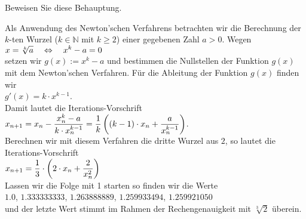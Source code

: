 \exercise
Beweisen Sie diese Behauptung. \eox


\example
Als Anwendung des
Newton'schen Verfahrens betrachten wir die Berechnung der $k$-ten Wurzel ($k\in\mathbb{N}$ mit
$k\geq 2$) einer gegebenen Zahl $a>0$. Wegen 
\\[0.2cm]
\hspace*{1.3cm}
$\displaystyle x = \sqrt[k]{a} \quad\Leftrightarrow\quad x^k - a = 0$
\\[0.2cm]
setzen wir $g(x) := x^k - a$ und bestimmen die Nullstellen der Funktion $g(x)$ mit dem
Newton'schen Verfahren.  F\"ur die Ableitung der Funktion $g(x)$ finden wir 
\\[0.2cm]
\hspace*{1.3cm}
$g'(x) = k\cdot x^{k-1}$.
\\[0.2cm]
Damit lautet die Iterations-Vorschrift
\\[0.3cm]
\hspace*{1.3cm}
$\displaystyle x_{n+1} = x_n - \frac{x_n^k - a}{k\cdot x_n^{k-1}} = \frac{1}{k} \left( (k-1)\cdot x_n + \frac{a}{x_n^{k-1}}\right)$.
\\[0.3cm]
Berechnen wir mit diesem Verfahren die dritte Wurzel aus $2$, so lautet die Iterations-Vorschrift
\\[0.2cm]
\hspace*{1.3cm}
$\displaystyle x_{n+1} = \frac{1}{3} \cdot \left( 2\cdot x_n + \frac{2}{x_n^{2}}\right)$
\\[0.2cm]                                 
Lassen wir die Folge mit 1 starten so finden wir die Werte 
\\[0.2cm]
\hspace*{1.3cm}
$1.0$, $1.333333333$, $1.263888889$, $1.259933494$, $1.259921050$ 
\\[0.2cm]
und der letzte Wert stimmt im Rahmen der Rechengenauigkeit mit $\sqrt[3]{2}$ \"uberein.

